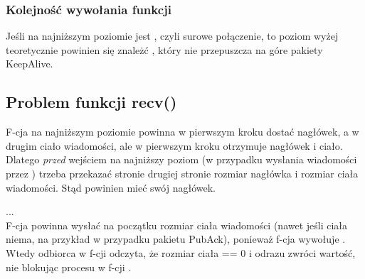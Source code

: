 	
	\subsubsection{Kolejność wywołania funkcji}
	
	Jeśli na najniższym poziomie jest , czyli surowe połączenie, to poziom wyżej teoretycznie powinien się znależć , który nie przepuszcza na góre pakiety KeepAlive. 
	
	
	
	\subsection{Problem funkcji recv()} 
	F-cja  na najniższym poziomie powinna w pierwszym kroku dostać nagłówek, a w drugim \da ciało wiadomości, ale w pierwszym kroku otrzymuje nagłówek i ciało. Dlatego \textit{przed} wejściem na najniższy poziom (w przypadku wysłania wiadomości przez ) trzeba przekazać stronie drugiej stronie rozmiar nagłówka i rozmiar ciała wiadomości. Stąd \da {} powinien mieć swój nagłówek.
	
	
	
	
	\Huge{...}\normalsize\\
	F-cja  powinna wysłać na początku rozmiar ciała wiadomości (nawet jeśli ciała niema, na przykład w przypadku pakietu PubAck), ponieważ f-cja  wywołuje . Wtedy odbiorca w f-cji  odczyta, że rozmiar ciała == 0 i odrazu zwróci wartość, nie blokując procesu w f-cji . 
	
